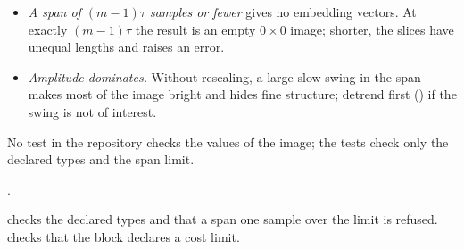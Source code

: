 \begin{itemize}
\item \emph{A span of $(m-1)\tau$ samples or fewer} gives no embedding vectors. At exactly
  $(m-1)\tau$ the result is an empty $0 \times 0$ image; shorter, the slices have unequal
  lengths and  raises an error.
\item \emph{Amplitude dominates.} Without rescaling, a large slow swing in the span makes
  most of the image bright and hides fine structure; detrend first
  () if the swing is not of interest.
\end{itemize}

No test in the repository checks the values of the image; the tests check only the declared
types and the span limit.

\citet{eckmann1987recurrence}.

 checks the declared types and that a span one sample
over the limit is refused.  checks that the block declares
a cost limit.
